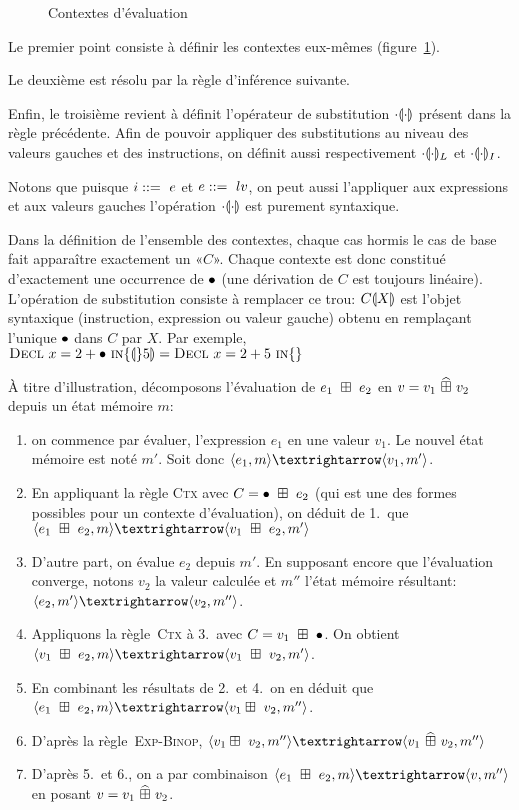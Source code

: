 \begin{figure}
\figctx{}

\caption{Contextes d'évaluation}
\label{fig:eval-ctx}
\end{figure}

Le premier point consiste à définir les contextes eux-mêmes
(figure~\ref{fig:eval-ctx}).

Le deuxième est résolu par la règle d'inférence suivante.

\begin{mathpar}
\end{mathpar}

Enfin, le troisième revient à définit l'opérateur de substitution
$\phxx{\ctxSub}$ présent dans la règle précédente. Afin de pouvoir appliquer des
substitutions au niveau des valeurs gauches et des instructions, on définit aussi
respectivement $\phxx{\ctxSubL}$ et $\phxx{\ctxSubI}$.

Notons que puisque $i \gramisa e$ et $e \gramisa lv$, on peut aussi l'appliquer
aux expressions et aux valeurs gauches l'opération $\phxx\ctxSub$ est purement
syntaxique.

Dans la définition de l'ensemble des contextes, chaque cas hormis le cas de base
fait apparaître exactement un «$C$». Chaque contexte est donc constitué
d'exactement une occurrence de $\ctxEmpty$ (une dérivation de $C$ est toujours
linéaire). L'opération de substitution consiste à remplacer ce trou:
$\ctxSub{C}{X}$ est l'objet syntaxique (instruction, expression ou valeur gauche)
obtenu en remplaçant l'unique $\ctxEmpty$ dans $C$ par $X$. Par exemple,
$\ctxSub{\iDecl{x}{2+\ctxEmpty}}{5} = \iDecl{x}{2+5}$

À titre d'illustration, décomposons l'évaluation de $e_1~\opbin~e_2$ en $v =
v_1~\widehat{\opbin}~v_2$ depuis un état mémoire $m$:

\begin{enumerate}
\item
  on commence par évaluer, l'expression $e_1$ en une valeur $v_1$. Le nouvel
  état mémoire est noté $m'$. Soit donc $\mm{m}{e_1}{m'}{v_1}$.
\item
  En appliquant la règle \textsc{Ctx} avec $C = \ctxOp{\ctxEmpty}{e_2}$ (qui est
  une des formes possibles pour un contexte d'évaluation), on déduit de 1.\ que
  $\mm{m}{e_1~\opbin~e_2}{m'}{v_1~\opbin~e_2}$
\item
  D'autre part, on évalue $e_2$ depuis $m'$. En supposant encore que
  l'évaluation converge, notons $v_2$ la valeur calculée et $m''$ l'état mémoire
  résultant: $\mm{m'}{e_2}{m''}{v_2}$.
\item
  Appliquons la règle~\textsc{Ctx} à 3.\ avec $C = \ctxOp{v_1}{\ctxEmpty}$. On
  obtient $\mm{m}{v_1~\opbin~e_2}{m'}{v_1~\opbin~v_2}$.
\item
  En combinant les résultats de 2.\ et 4.\ on en déduit que
  $\mm{m}{e_1~\opbin~e_2}{m''}{v_1\opbin~v_2}$.
\item D'après la règle~\textsc{Exp-Binop},
  $ \mm{m''}{v_1\opbin~v_2}{m''}{v_1~\widehat{\opbin}~v_2}$
\item D'après 5.\ et 6., on a par combinaison
  $\mm{m}{e_1~\opbin~e_2}{m''}{v}$
  en posant
  $v = v_1~\widehat{\opbin}~v_2$.
\end{enumerate}


